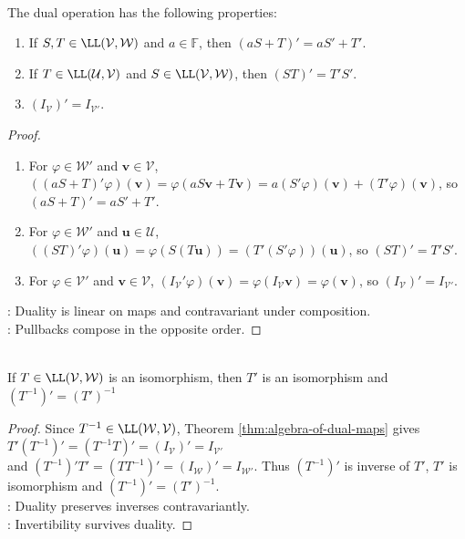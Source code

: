 \begin{theorem} \label{thm:algebra-of-dual-maps} \\
The dual operation has the following properties:
\begin{enumerate}[label=(\roman*)]
\setlength{\itemsep}{0pt}
\item If $S,T\in\LL(\mathcal{V},\mathcal{W})$ and $a\in\mathbb{F}$, then $(aS+T)'=aS'+T'$.
\item If $T\in\LL(\mathcal{U},\mathcal{V})$ and $S\in\LL(\mathcal{V},\mathcal{W})$, then $(ST)'=T'S'$.
\item $(I_{\mathcal{V}})'=I_{\mathcal{V}'}$.
\end{enumerate}
\begin{proof}
\begin{enumerate}[label=(\roman*)]
\setlength{\itemsep}{0pt}
\item For $\varphi\in\mathcal{W}'$ and $\mathbf{v}\in\mathcal{V}$, $\left((aS+T)'\varphi\right)(\mathbf{v}) =\varphi(aS\mathbf{v}+T\mathbf{v}) =a(S'\varphi)(\mathbf{v})+(T'\varphi)(\mathbf{v})$, so $(aS+T)'=aS'+T'$.
\item For $\varphi\in\mathcal{W}'$ and $\mathbf{u}\in\mathcal{U}$, $\left((ST)'\varphi\right)(\mathbf{u}) =\varphi(S(T\mathbf{u})) =\left(T'(S'\varphi)\right)(\mathbf{u})$, so $(ST)'=T'S'$.
\item For $\varphi\in\mathcal{V}'$ and $\mathbf{v}\in\mathcal{V}$, $(I_{\mathcal{V}}'\varphi)(\mathbf{v})=\varphi(I_{\mathcal{V}}\mathbf{v})=\varphi(\mathbf{v})$, so $(I_{\mathcal{V}})'=I_{\mathcal{V}'}$.
\end{enumerate}
: Duality is linear on maps and contravariant under composition.\\
: Pullbacks compose in the opposite order.
\end{proof}
\end{theorem}

\begin{corollary} \label{cor:dual-map-inverse} \\
If $T\in\LL(\mathcal{V},\mathcal{W})$ is an isomorphism, then $T'$ is an isomorphism and $(T^{-1})'=(T')^{-1}$
\begin{proof}
Since $T^{-1}\in\LL(\mathcal{W},\mathcal{V})$, Theorem \ref{thm:algebra-of-dual-maps} gives $T'(T^{-1})'=(T^{-1}T)'=(I_{\mathcal{V}})'=I_{\mathcal{V}'}$\\
and $(T^{-1})'T'=(TT^{-1})'=(I_{\mathcal{W}})'=I_{\mathcal{W}'}$. Thus $(T^{-1})'$ is inverse of $T'$, $T'$ is isomorphism and $(T^{-1})'=(T')^{-1}$.\\
: Duality preserves inverses contravariantly.\\
: Invertibility survives duality.
\end{proof}
\end{corollary}

